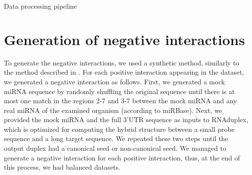 \begin{table}[h!]
\caption{Data processing pipeline}
\label{tab:preprocess}
\caption*{The table describes the set of actions required to transform the datasets into a uniform format to serve as input for further data analysis and machine learning experiments. The check-mark sign (\checkmark) represents a piece of information taken directly from the paper without additional calculations.}
\end{table}



\section{Generation of negative interactions}
To generate the negative interactions, we used a synthetic method, similarly to the method described in \cite{menor2014mirmark, john2004human, maragkakis2009accurate}. For each positive interaction appearing in the dataset, we generated a negative interaction as follows. First, we generated a mock miRNA sequence by randomly shuffling the original sequence until there is at most one match in the regions 2-7 and 3-7 between the mock miRNA and any real miRNA of the examined organism (according to miRBase). Next, we provided the mock miRNA and the full 3'UTR sequence as inputs to RNAduplex, which is optimized for computing the hybrid structure between a small probe sequence and a long target sequence. We repeated these two steps until the output duplex had a canonical seed or non-canonical seed. 
We managed to generate a negative interaction for each positive interaction, thus, at the end of this process, we had balanced datasets.

